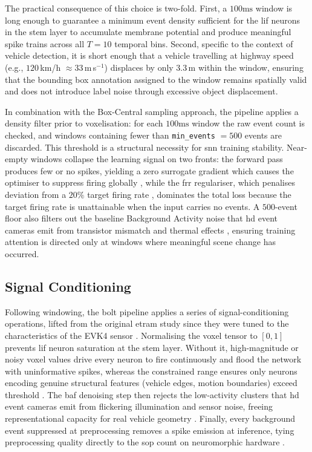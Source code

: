 The practical consequence of this choice is two-fold. 
First, a $100\text{ms}$ window is long enough to guarantee a minimum event density sufficient for the \gls{lif} neurons 
in the stem layer to accumulate membrane potential and produce meaningful spike trains 
across all $T = 10$ temporal bins. 
Second, specific to the context of vehicle detection, it is short enough that a vehicle travelling at highway speed (e.g., $120$\,km/h $\approx 33$\,m\,s$^{-1}$) displaces by
only $3.3$\,m within the window, ensuring that the bounding box annotation
assigned to the window remains spatially valid and does not introduce label noise through excessive object displacement.

In combination with the Box-Central sampling approach, the pipeline applies a density filter prior to voxelisation: for each $100\text{ms}$ window the raw event count is checked, and windows containing fewer than \texttt{min\_events} $= 500$ events are discarded. 
This threshold is a structural necessity for \gls{snn} training stability. 
Near-empty windows collapse the learning signal on two fronts: the forward pass produces few or no spikes, yielding a zero surrogate gradient \cite{neftci2019surrogate} which causes the optimiser to suppress firing globally \cite{eshraghian2021training}, while the \gls{frr} regulariser, which penalises deviation from a $20\%$ target firing rate \cite{deng2021comprehensive, yan2022backpropagation}, dominates the total loss because the target firing rate is unattainable when the input carries no events.
A $500$-event floor also filters out the baseline Background Activity noise that \gls{hd} event cameras emit from transistor mismatch and thermal effects \cite{gallego2020event}, ensuring training attention is directed only at windows where meaningful scene change has occurred.

\subsection{Signal Conditioning}

Following windowing, the \gls{bolt} pipeline applies a series of signal-conditioning operations, lifted from the original \gls{etram} study since they were tuned to the characteristics of the EVK4 sensor \cite{Verma_2024_CVPR}.
Normalising the voxel tensor to $[0, 1]$ prevents \gls{lif} neuron saturation at the stem layer. Without it, high-magnitude or noisy voxel values drive every neuron to fire continuously and flood the network with uninformative spikes, whereas the constrained range ensures only neurons encoding genuine structural features (vehicle edges, motion boundaries) exceed threshold \cite{eshraghian2021training}. 
The \gls{baf} denoising step then rejects the low-activity clusters that \gls{hd} event cameras emit from flickering illumination and sensor noise, freeing representational capacity for real vehicle geometry \cite{eshraghian2021training, Roy2019SpikeBasedMI}. 
Finally, every background event suppressed at preprocessing removes a spike emission at inference, tying preprocessing quality directly to the \gls{sop} count on neuromorphic hardware \cite{Roy2019SpikeBasedMI}.

